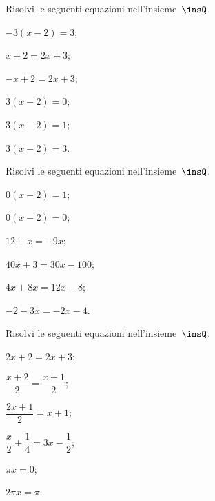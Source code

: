 \begin{esercizio}
\label{ese:13.27}
Risolvi le seguenti equazioni nell'insieme~$\insQ$.
\begin{multicols}{3}
\begin{enumeratea}
\spazielenx
 \item $-3(x-2)=3$;
 \item $x+2=2x+3$;
 \item $-x+2=2x+3$;
 \item $3(x-2)=0$;
 \item $3(x-2)=1$;
 \item $3(x-2)=3$.
\end{enumeratea}
\end{multicols}
\end{esercizio}

\begin{esercizio}
\label{ese:13.28}
Risolvi le seguenti equazioni nell'insieme~$\insQ$.
\begin{multicols}{3}
\begin{enumeratea}
\spazielenx
 \item $0(x-2)=1$;
 \item $0(x-2)=0$;
 \item $12+x=-9x$;
 \item $40x+3=30x-100$;
 \item $4x+8x=12x-8$;
 \item $-2-3x=-2x-4$.
\end{enumeratea}
\end{multicols}
\end{esercizio}

\begin{esercizio}
\label{ese:13.29}
Risolvi le seguenti equazioni nell'insieme~$\insQ$.
\begin{multicols}{3}
\begin{enumeratea}
\spazielenx
 \item $2x+2=2x+3$;
 \item $\dfrac{x+2}{2}=\dfrac{x+1}{2}$;
 \item $\dfrac{2x+1}{2}=x+1$;
 \item $\dfrac{x}{2}+\dfrac{1}{4}=3x-\dfrac{1}{2}$;
 \item $\pi x=0$;
 \item $2\pi x=\pi$.
\end{enumeratea}
\end{multicols}
\end{esercizio}

